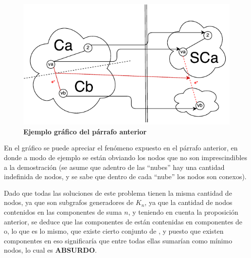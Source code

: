\documentclass[11pt, a4paper, twoside]{article}
\begin{document}
\begin{paragraph}
\begin{demostracion}
\begin{figure}[H]
   \begin{center}
   \includegraphics[width=1\textwidth]{diagrama_ej2.pdf}
   \caption{\textbf{Ejemplo gráfico del párrafo anterior}}
   \label{fig:ej2-1}
   \end{center}
\end{figure}

En el gráfico se puede apreciar el fenómeno expuesto en el párrafo anterior,
en donde a modo de ejemplo se están obviando los nodos que no son
imprescindibles a la demostración (se asume que adentro de las ``nubes'' hay
una cantidad indefinida de nodos, y se sabe que dentro de cada ``nube'' los
nodos son conexos).

\end{demostracion}

Dado que todas las soluciones de este problema tienen la misma cantidad de
nodos, ya que son subgrafos generadores de $K_n$, ya que la cantidad de nodos
contenidos en las  componentes de  suma $n$,
y teniendo en cuenta la proposición anterior, se deduce que las
 componentes de  están contenidas en
 componentes de  o, lo que es lo
mismo, que existe cierto conjunto de , y puesto que existen
 componentes en  eso significaría que entre
todas ellas sumarían como mínimo  nodos, lo cual es
\textbf{ABSURDO}.

\end{paragraph}
\end{document}
